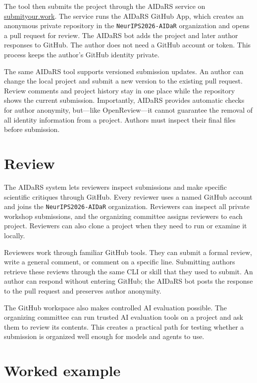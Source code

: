 \documentclass[10pt]{article}
\newcommand{\systemurl}{\href{https://submityour.work}{submityour.work}}
\begin{document}
The tool then submits the project through the AIDaRS service on \systemurl{}. The service
runs the AIDaRS GitHub App, which creates an anonymous private repository in the
\texttt{NeurIPS2026-AIDaR} organization and opens a pull request for review.
The AIDaRS bot adds the project and later author responses to GitHub. The
author does not need a GitHub account or token. This process keeps the author's
GitHub identity private.

The same AIDaRS tool supports versioned submission updates. An author can change the local project and submit a new version to the existing pull request. Review comments and project history stay in one place while the repository shows the current submission.
Importantly, AIDaRS provides automatic checks for author anonymity, but---like
OpenReview---it cannot guarantee the removal of all identity information from a
project. Authors must inspect their final files before submission.

\section{Review}

The AIDaRS system lets reviewers inspect submissions and make specific scientific
critiques through GitHub. Every reviewer uses a named GitHub account and joins
the \texttt{NeurIPS2026-AIDaR} organization. Reviewers can inspect all private
workshop submissions, and the organizing committee assigns reviewers to each
project. Reviewers can also clone a project when they need to run or examine it
locally.

Reviewers work through familiar GitHub tools. They can submit a formal review,
write a general comment, or comment on a specific line. Submitting authors retrieve these
reviews through the same CLI or skill that they used to submit. An author can
respond without entering GitHub; the AIDaRS bot posts the response to the pull
request and preserves author anonymity.

The GitHub workspace also makes controlled AI evaluation possible. The
organizing committee can run trusted AI evaluation tools on a project and ask
them to review its contents. This creates a practical path for testing whether a
submission is organized well enough for models and agents to use.

\section{Worked example}
\end{document}
